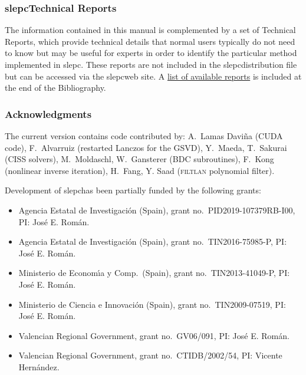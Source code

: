 \documentclass[titlepage,10pt,a4paper]{book}
\newcommand{\packnoi}[1]{{\sc #1}\xspace}
\newcommand{\slepc}{\texorpdfstring{\packnoi{slep\rm c}}{{SLEPc}}}
\begin{document}
{\subsubsection*{\slepc Technical Reports}

	The information contained in this manual is complemented by a set of Technical Reports, which provide technical details that normal users typically do not need to know but may be useful for experts in order to identify the particular method implemented in \slepc. These reports are not included in the \slepc distribution file but can be accessed via the \slepc web site. A \hyperlink{str}{list of available reports} is included at the end of the Bibliography.


\subsubsection*{Acknowledgments}


	The current version contains code contributed by:
A.\ Lamas Davi\~{n}a (CUDA code),
F.\ Alvarruiz (restarted Lanczos for the GSVD),
Y.\ Maeda, T.\ Sakurai (CISS solvers),
M.\ Moldaschl, W.\ Gansterer (BDC subroutines),
F.\ Kong (nonlinear inverse iteration),
H.\ Fang, Y. Saad (\textsc{filtlan} polynomial filter).

	Development of \slepc has been partially funded by the following grants:
\begin{itemize}
\setlength{\itemsep}{-2pt}
\item Agencia Estatal de Investigaci\'on (Spain), grant no.\ PID2019-107379RB-I00, PI: Jos\'e E. Rom\'an.
\item Agencia Estatal de Investigaci\'on (Spain), grant no.\ TIN2016-75985-P, PI: Jos\'e E. Rom\'an.
\item Ministerio de Econom\'{\i}a y Comp.\ (Spain), grant no.\ TIN2013-41049-P, PI: Jos\'e E. Rom\'an.
\item Ministerio de Ciencia e Innovaci\'on (Spain), grant no.\ TIN2009-07519, PI: Jos\'e E. Rom\'an.
\item Valencian Regional Government, grant no.\ GV06/091, PI: Jos\'e E. Rom\'an.
\item Valencian Regional Government, grant no.\ CTIDB/2002/54, PI: Vicente Hern\'andez.
\end{itemize}

}
\end{document}
